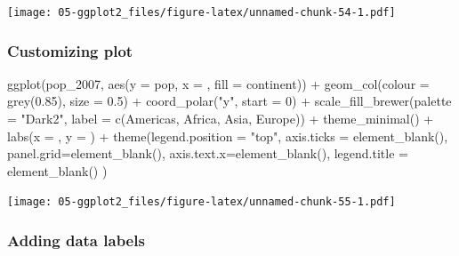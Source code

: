 \documentclass[
]{book}
\newenvironment{Shaded}{\begin{snugshade}}{\end{snugshade}}
\newcommand{\AttributeTok}[1]{\textcolor[rgb]{0.77,0.63,0.00}{#1}}
\newcommand{\DecValTok}[1]{\textcolor[rgb]{0.00,0.00,0.81}{#1}}
\newcommand{\FloatTok}[1]{\textcolor[rgb]{0.00,0.00,0.81}{#1}}
\newcommand{\FunctionTok}[1]{\textcolor[rgb]{0.00,0.00,0.00}{#1}}
\newcommand{\NormalTok}[1]{#1}
\newcommand{\SpecialCharTok}[1]{\textcolor[rgb]{0.00,0.00,0.00}{#1}}
\newcommand{\StringTok}[1]{\textcolor[rgb]{0.31,0.60,0.02}{#1}}
\begin{document}
\texttt{[image: 05-ggplot2\_files/figure-latex/unnamed-chunk-54-1.pdf]}

\hypertarget{customizing-plot-1}{%
\subsubsection{Customizing plot}\label{customizing-plot-1}}

\begin{Shaded}
\begin{Highlighting}[]
\FunctionTok{ggplot}\NormalTok{(pop\_2007, }\FunctionTok{aes}\NormalTok{(}\AttributeTok{y =}\NormalTok{ pop, }\AttributeTok{x =} \StringTok{\textquotesingle{}\textquotesingle{}}\NormalTok{, }\AttributeTok{fill =}\NormalTok{ continent)) }\SpecialCharTok{+} 
   \FunctionTok{geom\_col}\NormalTok{(}\AttributeTok{colour =} \FunctionTok{grey}\NormalTok{(}\FloatTok{0.85}\NormalTok{), }\AttributeTok{size =} \FloatTok{0.5}\NormalTok{) }\SpecialCharTok{+}
   \FunctionTok{coord\_polar}\NormalTok{(}\StringTok{"y"}\NormalTok{, }\AttributeTok{start =} \DecValTok{0}\NormalTok{) }\SpecialCharTok{+}
   \FunctionTok{scale\_fill\_brewer}\NormalTok{(}\AttributeTok{palette =} \StringTok{"Dark2"}\NormalTok{, }\AttributeTok{label =} \FunctionTok{c}\NormalTok{(}\StringTok{\textquotesingle{}Americas\textquotesingle{}}\NormalTok{, }\StringTok{\textquotesingle{}Africa\textquotesingle{}}\NormalTok{, }\StringTok{\textquotesingle{}Asia\textquotesingle{}}\NormalTok{, }\StringTok{\textquotesingle{}Europe\textquotesingle{}}\NormalTok{)) }\SpecialCharTok{+}
   \FunctionTok{theme\_minimal}\NormalTok{() }\SpecialCharTok{+}
   \FunctionTok{labs}\NormalTok{(}\AttributeTok{x =} \StringTok{\textquotesingle{}\textquotesingle{}}\NormalTok{, }\AttributeTok{y =} \StringTok{\textquotesingle{}\textquotesingle{}}\NormalTok{) }\SpecialCharTok{+}
   \FunctionTok{theme}\NormalTok{(}\AttributeTok{legend.position =} \StringTok{"top"}\NormalTok{, }
         \AttributeTok{axis.ticks =} \FunctionTok{element\_blank}\NormalTok{(), }
         \AttributeTok{panel.grid=}\FunctionTok{element\_blank}\NormalTok{(), }
         \AttributeTok{axis.text.x=}\FunctionTok{element\_blank}\NormalTok{(), }
         \AttributeTok{legend.title =} \FunctionTok{element\_blank}\NormalTok{()}
\NormalTok{)}
\end{Highlighting}
\end{Shaded}

\texttt{[image: 05-ggplot2\_files/figure-latex/unnamed-chunk-55-1.pdf]}

\hypertarget{adding-data-labels}{%
\subsubsection{Adding data labels}\label{adding-data-labels}}
\end{document}
